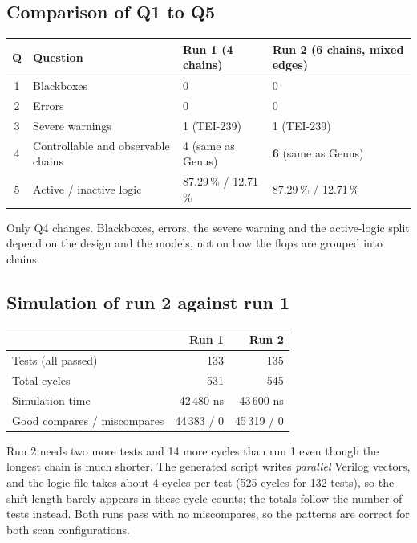 \documentclass[11pt]{article}
\renewcommand{\_}{\oldus\hspace{0pt}}
\begin{document}
\subsection*{Comparison of Q1 to Q5}
\begin{center}\small
\begin{tabular}{@{}clll@{}}
\toprule
\textbf{Q} & \textbf{Question} & \textbf{Run 1 (4 chains)} & \textbf{Run 2 (6 chains, mixed edges)} \\ \midrule
1 & Blackboxes & 0 & 0 \\
2 & Errors & 0 & 0 \\
3 & Severe warnings & 1 (TEI-239) & 1 (TEI-239) \\
4 & Controllable and observable chains & 4 (same as Genus) & \textbf{6} (same as Genus) \\
5 & Active / inactive logic & 87.29\,\% / 12.71\,\% & 87.29\,\% / 12.71\,\% \\
\bottomrule
\end{tabular}
\end{center}

Only Q4 changes. Blackboxes, errors, the severe warning and the active-logic split depend on the design and the models, not on how the
flops are grouped into chains.

\subsection*{Simulation of run 2 against run 1}
\begin{center}\small
\begin{tabular}{@{}lrr@{}}
\toprule
 & \textbf{Run 1} & \textbf{Run 2} \\ \midrule
Tests (all passed) & 133 & 135 \\
Total cycles & 531 & 545 \\
Simulation time & 42\,480 ns & 43\,600 ns \\
Good compares / miscompares & 44\,383 / 0 & 45\,319 / 0 \\
\bottomrule
\end{tabular}
\end{center}

Run 2 needs two more tests and 14 more cycles than run 1 even though the longest chain is much shorter. The generated script writes
\emph{parallel} Verilog vectors, and the logic file takes about 4 cycles per test (525 cycles for 132 tests), so the shift length
barely appears in these cycle counts; the totals follow the number of tests instead. Both runs pass with no miscompares, so the
patterns are correct for both scan configurations.
\end{document}
